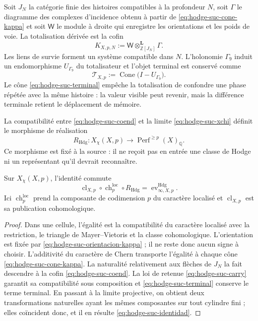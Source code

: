 Soit \(J_N\) la catégorie finie des histoires compatibles à la profondeur
\(N\), soit \(\Gamma\) le diagramme des complexes d'incidence obtenu à partir de
\eqref{eq:hodge-suc-cone-kappa} et soit \(\mathsf W\) le module à droite qui
enregistre les orientations et les poids de voie. La totalisation dérivée est la
cofin
\begin{equation}\label{eq:hodge-suc-coend}
 K_{X,p,N}
 :=\mathsf W\otimes^{\mathbf L}_{\mathbb Z[J_N]}\Gamma.
\end{equation}
Les liens de survie forment un système compatible dans \(N\).
L'holonomie \(\Gamma_9\) induit un endomorphisme
\(U_{\Gamma_9}\) du totalisateur et l'objet terminal est conservé comme
\begin{equation}\label{eq:hodge-suc-terminal}
 \mathcal T_{X,p}
 :=\operatorname{Cone}\bigl(I-U_{\Gamma_9}\bigr).
\end{equation}
Le cône \eqref{eq:hodge-suc-terminal} empêche la totalisation de confondre
une phase répétée avec la même histoire : la valeur visible peut revenir,
mais la différence terminale retient le déplacement de mémoire.

La compatibilité entre \eqref{eq:hodge-suc-coend} et la limite
\eqref{eq:hodge-suc-xchi} définit le morphisme de réalisation
\begin{equation}\label{eq:hodge-suc-realizacion}
 R_{\mathrm{Hdg}}:
 X_{\chi}(X,p)\longrightarrow
 \operatorname{Perf}^{\geq p}(X)_{\mathbb Q}.
\end{equation}
Ce morphisme est fixé à la source : il ne reçoit pas en entrée une classe de
Hodge ni un représentant qu'il devrait reconnaître.

\begin{theorem}
\label{thm:hodge-suc-identidad}
Sur \(X_{\chi}(X,p)\), l'identité commute
\begin{equation}\label{eq:hodge-suc-identidad}
 \operatorname{cl}_{X,p}\circ
 \operatorname{ch}^{\mathrm{loc}}_{p}\circ
 R_{\mathrm{Hdg}}
 =\operatorname{ev}^{\mathrm{Hdg}}_{\infty,X,p}.
\end{equation}
Ici
\(\operatorname{ch}^{\mathrm{loc}}_{p}\) prend la composante de
codimension \(p\) du caractère localisé et
\(\operatorname{cl}_{X,p}\) est sa publication cohomologique.
\end{theorem}

\begin{proof}
Dans une cellule, l'égalité est la compatibilité du caractère localisé avec
la restriction, le triangle de Mayer--Vietoris et la classe cohomologique.
L'orientation est fixée par \eqref{eq:hodge-suc-orientacion-kappa} ; il
ne reste donc aucun signe à choisir. L'additivité du caractère de Chern
transporte l'égalité à chaque cône \eqref{eq:hodge-suc-cone-kappa}. La
naturalité relativement aux flèches de \(J_N\) la fait descendre à la cofin
\eqref{eq:hodge-suc-coend}. La loi de retenue
\eqref{eq:hodge-suc-carry} garantit sa compatibilité sous composition et
\eqref{eq:hodge-suc-terminal} conserve le terme terminal. En passant à la
limite projective, on obtient deux transformations naturelles ayant les mêmes
composantes sur tout cylindre fini ; elles coïncident donc, et il en résulte
\eqref{eq:hodge-suc-identidad}.
\end{proof}

